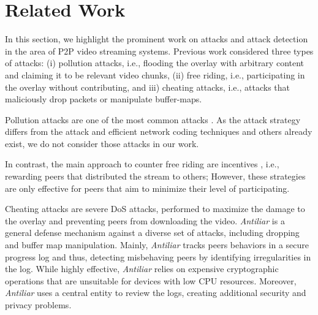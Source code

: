 \section{Related Work}
\label{sec:related}

In this section, we highlight the prominent work on attacks and attack detection in the area of P2P video streaming systems.
Previous work considered three types of attacks: (i) pollution attacks, i.e., flooding the overlay with arbitrary content and claiming it to be relevant video chunks, (ii) free riding, i.e., participating in the overlay without contributing, and iii) cheating attacks, i.e., attacks that maliciously drop packets or manipulate buffer-maps. 

Pollution attacks are one of the most common attacks \cite{pollution1}. 
As the attack strategy differs from the \drop attack and efficient network coding techniques \cite{nc} and others \cite{pollution2} already exist, we do not consider those attacks in our work.

In contrast, the main approach to counter free riding are incentives \cite{defending,defending2}, i.e., rewarding peers that distributed the stream to others; 
However, these strategies are only effective for peers that aim to minimize their level of participating. 

Cheating attacks are severe DoS attacks, performed to maximize the damage to the overlay and preventing peers from downloading the video.   
\textit{Antiliar} is a general defense mechanism against a diverse set of attacks, including dropping and buffer map manipulation\cite{antiliar}.
Mainly, \textit{Antiliar} tracks peers behaviors in a secure progress log and thus, detecting misbehaving peers by identifying irregularities in the log. 
While highly effective, \textit{Antiliar} relies on expensive cryptographic operations that are unsuitable for devices with low CPU resources.
Moreover, \textit{Antiliar} uses a central entity to review the logs, creating additional security and privacy problems. 


